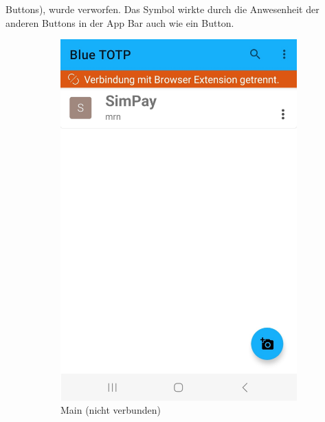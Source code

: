 Buttons), wurde verworfen. Das Symbol wirkte durch die Anwesenheit der anderen 
Buttons in der App Bar auch wie ein Button.
\begin{figure}[h]
    \centering
    \begin{subfigure}{.23\textwidth}
      \centering
      \includegraphics[width=.95\linewidth]{figures/impl/screenshot_app_nicht_verbunden.jpg}
      \caption{Main (nicht verbunden)}
      \label{fig: blue totp app screenshot nicht verbunden}
    \end{subfigure}%
    \begin{subfigure}{.23\textwidth}
      \centering

\end{subfigure}
\end{figure}
